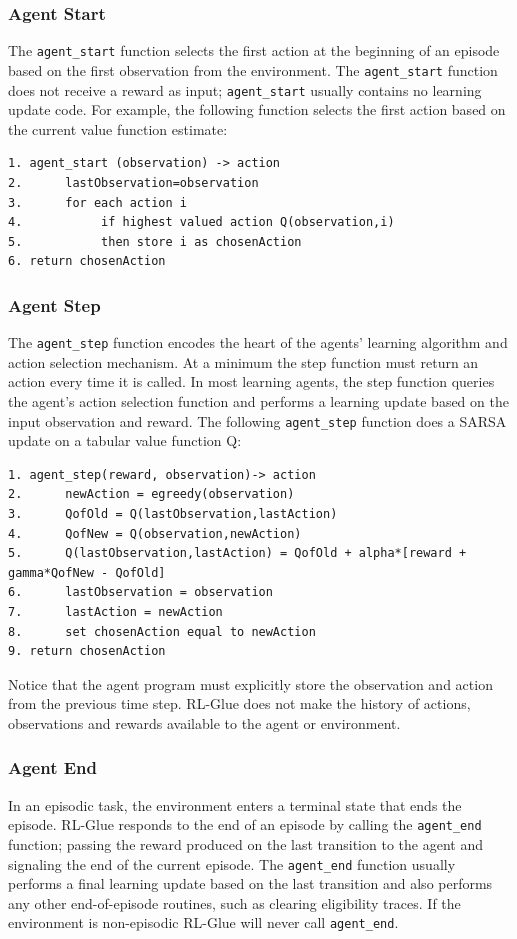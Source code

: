 \documentclass[11pt]{article}
\begin{document}
\subsubsection{Agent Start}
The \texttt{agent\_start} function selects the first action at the beginning of an episode based on the first observation from the environment. The \texttt{agent\_start} function does not receive a reward as input; \texttt{agent\_start} usually contains no learning update code. For example, the following function selects the first action based on the current value function estimate:
\begin{verbatim}
1. agent_start (observation) -> action
2.      lastObservation=observation
3.      for each action i
4.           if highest valued action Q(observation,i)
5.           then store i as chosenAction
6. return chosenAction
\end{verbatim}

\subsubsection{Agent Step}
The \texttt{agent\_step} function encodes the heart of the agents' learning algorithm and action selection mechanism. At a minimum the step function must return an action every time it is called. In most learning agents, the step function queries the agent's action selection function and performs a learning update based on the input observation and reward. The following \texttt{agent\_step} function does a SARSA update on a tabular value function Q:
\begin{verbatim}
1. agent_step(reward, observation)-> action
2.      newAction = egreedy(observation)
3.      QofOld = Q(lastObservation,lastAction)
4.      QofNew = Q(observation,newAction) 
5.      Q(lastObservation,lastAction) = QofOld + alpha*[reward + gamma*QofNew - QofOld]
6.      lastObservation = observation
7.      lastAction = newAction
8.      set chosenAction equal to newAction
9. return chosenAction
\end{verbatim}  
Notice that the agent program must explicitly store the observation and action from the previous time step. RL-Glue does not make the history of actions, observations and rewards available to the agent or environment.

\subsubsection{Agent End}
In an episodic task, the environment enters a terminal state that ends the episode. RL-Glue responds to the end of an episode by calling the \texttt{agent\_end} function; passing the reward produced on the last transition to the agent and signaling the end of the current episode. The \texttt{agent\_end} function usually performs a final learning update based on the last transition and also performs any other end-of-episode routines, such as clearing eligibility traces. If the environment is non-episodic RL-Glue will never call \texttt{agent\_end}.
\end{document}

